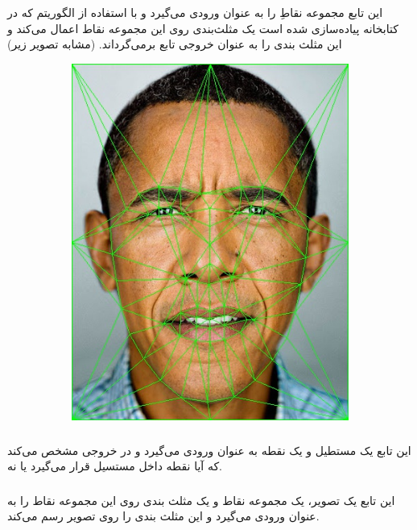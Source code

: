 \documentclass[a4paper,12pt]{article}
\begin{document}
\subsubsection*{}
این تابع مجموعه نقاطِ
را به عنوان ورودی می‌گیرد و با استفاده از الگوریتم
که در کتابخانه 
پیاده‌سازی شده است یک مثلث‌بندی روی این مجموعه نقاط اعمال می‌کند و این مثلث بندی را به عنوان خروجی تابع بر‌می‌گرداند. (مشابه تصویر زیر)
\begin{figure}[H]
	\centering
	\begin{subfigure}{0.6\textwidth}
		\centering
		\includegraphics[width=.5\textwidth]{7.jpg}
	\end{subfigure}
\end{figure}
\subsubsection*{}
این تابع یک مستطیل و یک نقطه به عنوان ورودی می‌گیرد و در خروجی مشخص می‌کند که آیا نقطه داخل مستسیل قرار می‌گیرد یا نه.
\subsubsection*{}
این تابع یک تصویر، یک مجموعه نقاط و یک مثلث بندی روی این مجموعه نقاط را به عنوان ورودی می‌گیرد و این مثلث بندی را روی تصویر رسم می‌کند.
\end{document}

